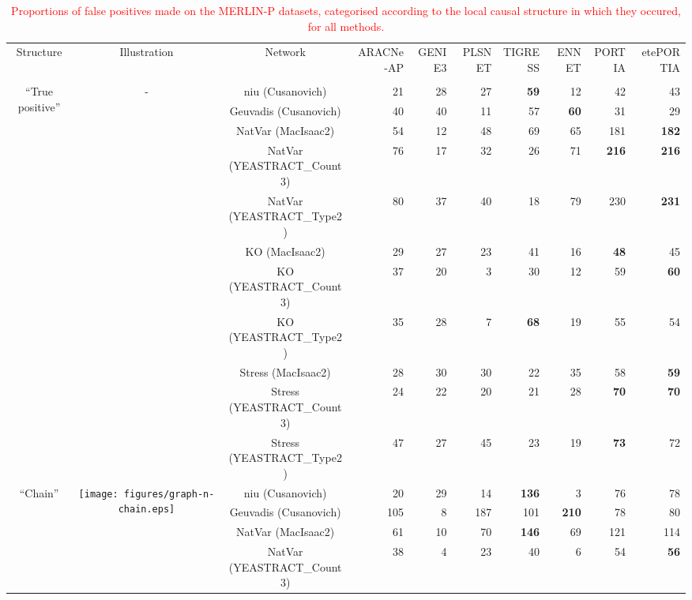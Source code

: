 \begin{table*}[t]
\caption{\textcolor{red}{Proportions of false positives made on the MERLIN-P datasets, categorised according to the local causal structure in which they occured, for all methods.}\label{tab:fp-categories-merlinp}}\begin{adjustbox}{max width=\textwidth}\color{red}\begin{tabular}{cccrrrrrrr} \\ \toprule
Structure & Illustration & Network & ARACNe-AP & GENIE3 & PLSNET & TIGRESS & ENNET & PORTIA & etePORTIA \\
          
 &  &  &  &  &  &  &  &  &  \\ \midrule
\multirow{11}{*}{``True positive''} & \multirow{11}{*}{-} & niu (Cusanovich) & 21 & 28 & 27 & \textbf{59} & 12 & 42 & 43 \\
  &   & Geuvadis (Cusanovich) & 40 & 40 & 11 & 57 & \textbf{60} & 31 & 29 \\
  &   & NatVar (MacIsaac2) & 54 & 12 & 48 & 69 & 65 & 181 & \textbf{182} \\
  &   & NatVar (YEASTRACT\_Count3) & 76 & 17 & 32 & 26 & 71 & \textbf{216} & \textbf{216} \\
  &   & NatVar (YEASTRACT\_Type2) & 80 & 37 & 40 & 18 & 79 & 230 & \textbf{231} \\
  &   & KO (MacIsaac2) & 29 & 27 & 23 & 41 & 16 & \textbf{48} & 45 \\
  &   & KO (YEASTRACT\_Count3) & 37 & 20 & 3 & 30 & 12 & 59 & \textbf{60} \\
  &   & KO (YEASTRACT\_Type2) & 35 & 28 & 7 & \textbf{68} & 19 & 55 & 54 \\
  &   & Stress (MacIsaac2) & 28 & 30 & 30 & 22 & 35 & 58 & \textbf{59} \\
  &   & Stress (YEASTRACT\_Count3) & 24 & 22 & 20 & 21 & 28 & \textbf{70} & \textbf{70} \\
  &   & Stress (YEASTRACT\_Type2) & 47 & 27 & 45 & 23 & 19 & \textbf{73} & 72 \\
\midrule
\multirow{11}{*}{``Chain''} & \multirow{11}{*}{\texttt{[image: figures/graph-n-chain.eps]}} & niu (Cusanovich) & 20 & 29 & 14 & \textbf{136} & 3 & 76 & 78 \\
  &   & Geuvadis (Cusanovich) & 105 & 8 & 187 & 101 & \textbf{210} & 78 & 80 \\
  &   & NatVar (MacIsaac2) & 61 & 10 & 70 & \textbf{146} & 69 & 121 & 114 \\
  &   & NatVar (YEASTRACT\_Count3) & 38 & 4 & 23 & 40 & 6 & 54 & \textbf{56} \\

\end{tabular}
\end{adjustbox}
\end{table*}
